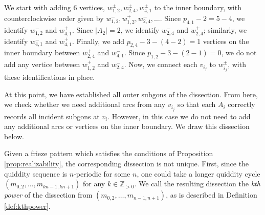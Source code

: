 \documentclass[12pt]{article}
\theoremstyle{remark}
\newcommand*{\Z}{\mathbb{Z}}
\begin{document}
We start with adding 6 vertices, $w_{1,2}^\pm, w_{2,4}^\pm, w_{4,1}^\pm$ to the inner boundary, with counterclockwise order given by $w_{1,2}^-,w_{1,2}^+,w_{2,4}^-,\ldots$. Since $p_{4,1} -2 = 5-4$, we identify $w_{1,2}^-$ and $w_{4,1}^+$. Since $\vert A_2\vert =2$, we identify $w_{2,4}^-$ and $w_{2,4}^+$; similarly, we identify $w_{4,1}^-$ and $w_{4,1}^+$. Finally, we add $p_{2,4} - 3 - (4-2) = 1$ vertices on the inner boundary between $w_{2,4}^+$ and $w_{4,1}^-$.  Since $p_{1,2} - 3 - (2 - 1) = 0$, we do not add any vertice between $w_{1,2}^+$ and $w_{2,4}^-$. Now, we connect each $v_{i_j}$ to $w_{i_j}^\pm$, with these identifications in place.

At this point, we have established all outer subgons of the dissection. From here, we check whether we need additional arcs from any $v_{i_j}$ so that each $A_i$ correctly records all incident subgons at $v_i$. However, in this case we do not need to add any additional arcs or vertices on the inner boundary. We draw this dissection below. 

\begin{center}
  \end{center}

Given a frieze pattern which satisfies the conditions of Proposition \ref{prop:realizability}, the corresponding dissection is not unique. First, since the quiddity sequence is $n$-periodic for some $n$, one could take a longer quiddity cycle $(m_{0,2},\ldots,m_{kn-1,kn+1})$ for any $k \in \Z_{>0}$. We call the resulting dissection the \emph{kth power} of the dissection from $(m_{0,2},\ldots,m_{n-1,n+1})$, as is described in Definition \ref{def:kthpower}.
\end{document}
